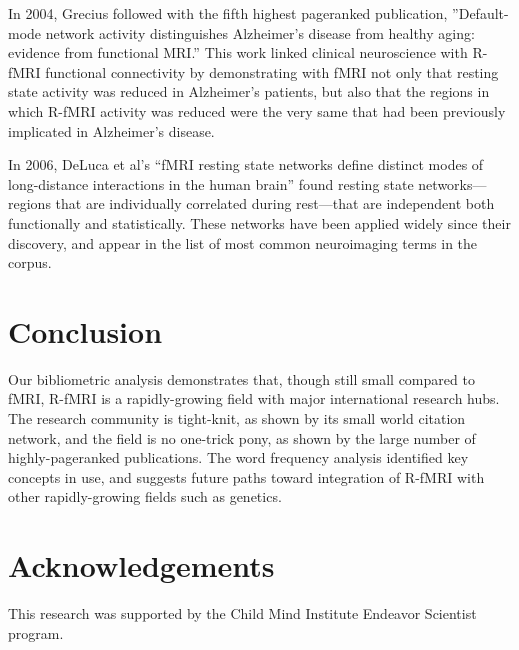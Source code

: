 \documentclass[12pt,3p]{elsarticle}
\begin{document}
In 2004, Grecius followed with the fifth highest pageranked publication,
''Default-mode network activity distinguishes Alzheimer’s disease from healthy
aging: evidence from functional MRI.'' This work linked clinical neuroscience
with R-fMRI functional connectivity by demonstrating with fMRI not only that
resting state activity was reduced in Alzheimer’s patients, but also that the
regions in which R-fMRI activity was reduced were the very same that had been
previously implicated in Alzheimer’s disease. 

In 2006, DeLuca et al’s ``fMRI resting state networks define distinct modes of
long-distance interactions in the human brain'' found resting state
networks—regions that are individually correlated during rest—that are
independent both functionally and statistically. These networks have been
applied widely since their discovery, and appear in the list of most common
neuroimaging terms in the corpus.


\section{Conclusion}

Our bibliometric analysis demonstrates that, though still small compared to
fMRI, R-fMRI is a rapidly-growing field with major international research hubs.
The research community is tight-knit, as shown by its small world citation
network, and the field is no one-trick pony, as shown by the large number of
highly-pageranked publications. The word frequency analysis identified key
concepts in use, and suggests future paths toward integration of R-fMRI with
other rapidly-growing fields such as genetics.

\section{Acknowledgements}
This research was supported by the Child Mind Institute Endeavor Scientist program.
\end{document}

